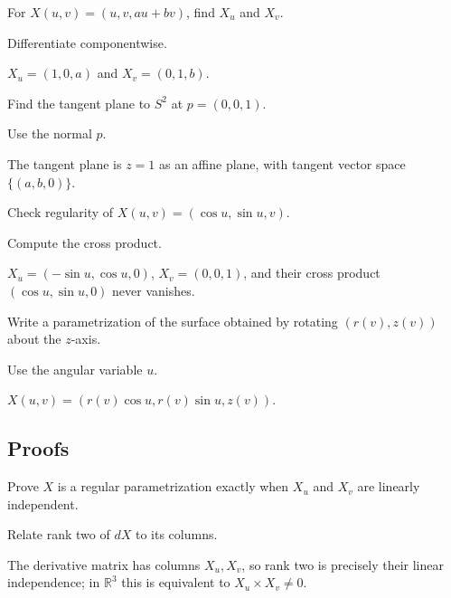 \begin{exercise}\label{exr:vii14-ped-02}
For \(X(u,v)=(u,v,au+bv)\), find \(X_u\) and \(X_v\).
\end{exercise}
\begin{hint}
Differentiate componentwise.
\end{hint}
\begin{solution}
\(X_u=(1,0,a)\) and \(X_v=(0,1,b)\).
\end{solution}

\begin{exercise}\label{exr:vii14-ped-03}
Find the tangent plane to \(S^2\) at \(p=(0,0,1)\).
\end{exercise}
\begin{hint}
Use the normal \(p\).
\end{hint}
\begin{solution}
The tangent plane is \(z=1\) as an affine plane, with tangent vector space \(\{(a,b,0)\}\).
\end{solution}

\begin{exercise}\label{exr:vii14-ped-04}
Check regularity of \(X(u,v)=(\cos u,\sin u,v)\).
\end{exercise}
\begin{hint}
Compute the cross product.
\end{hint}
\begin{solution}
\(X_u=(-\sin u,\cos u,0)\), \(X_v=(0,0,1)\), and their cross product \((\cos u,\sin u,0)\) never vanishes.
\end{solution}

\begin{exercise}\label{exr:vii14-ped-05}
Write a parametrization of the surface obtained by rotating \((r(v),z(v))\) about the \(z\)-axis.
\end{exercise}
\begin{hint}
Use the angular variable \(u\).
\end{hint}
\begin{solution}
\(X(u,v)=(r(v)\cos u,r(v)\sin u,z(v))\).
\end{solution}

\subsection*{Proofs}

\begin{exercise}\label{exr:vii14-ped-06}
Prove \(X\) is a regular parametrization exactly when \(X_u\) and \(X_v\) are linearly independent.
\end{exercise}
\begin{hint}
Relate rank two of \(dX\) to its columns.
\end{hint}
\begin{solution}
The derivative matrix has columns \(X_u,X_v\), so rank two is precisely their linear independence; in \(\mathbb R^3\) this is equivalent to \(X_u\times X_v\neq0\).
\end{solution}


